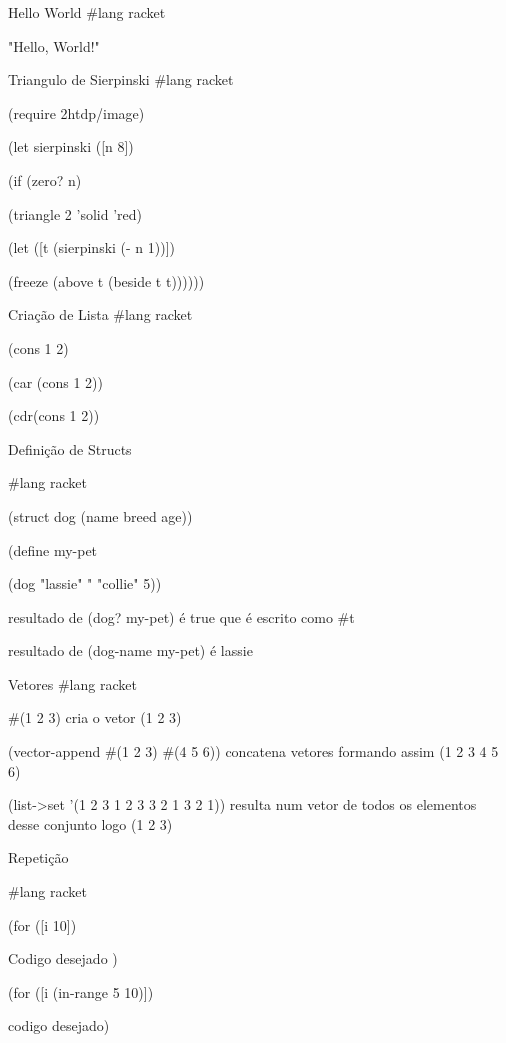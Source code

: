 \documentclass{beamer}
\begin{document}
\begin{frame}{Hello World}
\#lang racket

"Hello, World!"
\end{frame}


\begin{frame}{Triangulo de Sierpinski}
\#lang racket

(require 2htdp/image)

(let sierpinski ([n 8])

  (if (zero? n)
  
    (triangle 2 'solid 'red)
    
    (let ([t (sierpinski (- n 1))])
    
      (freeze (above t (beside t t))))))


\end{frame}


\begin{frame}{Criação de Lista}
\#lang racket

(cons 1 2)

(car (cons 1 2))

(cdr(cons 1 2))
        
\end{frame}


\begin{frame}{Definição de Structs}

\#lang racket

(struct dog (name breed age))

(define my-pet

  (dog "lassie" " "collie" 5))
  
resultado de (dog? my-pet) é true que é escrito como \#t

resultado de (dog-name my-pet) é lassie
  

\end{frame}
\begin{frame}{Vetores}
\#lang racket

\#(1 2 3) cria o vetor (1 2 3)

(vector-append \#(1 2 3) \#(4 5 6)) concatena vetores formando assim (1 2 3 4 5 6)

(list-\textgreater set '(1 2 3 1 2 3 3 2 1 3 2 1)) resulta num vetor de todos os elementos desse conjunto logo (1 2 3)


\end{frame}
\begin{frame}{Repetição}

\#lang racket

(for ([i 10])

  Codigo desejado )
  
(for ([i (in-range 5 10)])

  codigo desejado)
    

\end{frame}
\end{document}
